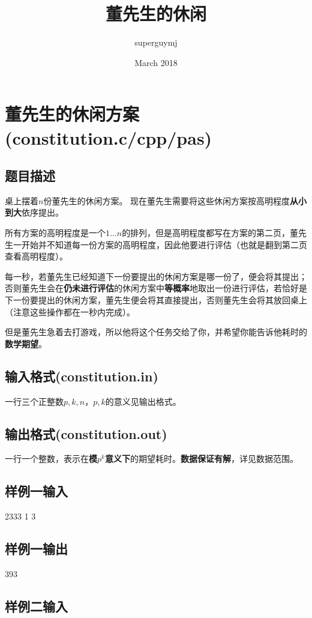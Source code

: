 \documentclass{article}
\title{董先生的休闲}
\author{superguymj}
\date{March 2018}
\begin{document}
\section*{董先生的休闲方案(constitution.c/cpp/pas)}


\subsection*{题目描述}

桌上摆着$n$份董先生的休闲方案。
现在董先生需要将这些休闲方案按高明程度\textbf{从小到大}依序提出。

所有方案的高明程度是一个$1 \dots n$的排列，但是高明程度都写在方案的第二页，董先生一开始并不知道每一份方案的高明程度，因此他要进行评估（也就是翻到第二页查看高明程度）。

每一秒，若董先生已经知道下一份要提出的休闲方案是哪一份了，便会将其提出；否则董先生会在\textbf{仍未进行评估}的休闲方案中\textbf{等概率}地取出一份进行评估，若恰好是下一份要提出的休闲方案，董先生便会将其直接提出，否则董先生会将其放回桌上（注意这些操作都在一秒内完成）。

但是董先生急着去打游戏，所以他将这个任务交给了你，并希望你能告诉他耗时的\textbf{数学期望}。

\subsection*{输入格式(constitution.in)}

一行三个正整数$p,k,n$，$p,k$的意义见输出格式。

\subsection*{输出格式(constitution.out)}

一行一个整数，表示在\textbf{模$p^k$意义下}的期望耗时。\textbf{数据保证有解}，详见数据范围。

\subsection*{样例一输入}

2333 1 3

\subsection*{样例一输出}

393

\subsection*{样例二输入}
\end{document}
